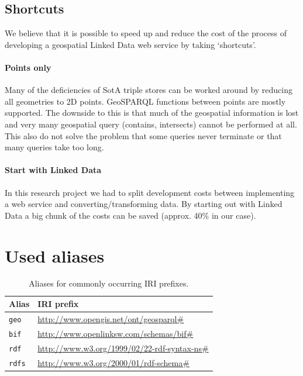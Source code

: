 \documentclass[a4paper]{scrartcl}
\newcommand{\textt}[1]{{\small \texttt{#1}}}
\begin{document}
\subsection{Shortcuts}

We believe that it is possible to speed up and reduce the cost of the
process of developing a geospatial Linked Data web service by taking
`shortcuts'.


\paragraph{Points only}

Many of the deficiencies of SotA triple stores can be worked around by
reducing all geometries to 2D points.  GeoSPARQL functions between
points are mostly supported.  The downside to this is that much of the
geospatial information is lost and very many geospatial query
(contains, intersects) cannot be performed at all.  This also do not
solve the problem that some queries never terminate or that many
queries take too long.


\paragraph{Start with Linked Data}

In this research project we had to split development costs between
implementing a web service and converting/transforming data.  By
starting out with Linked Data a big chunk of the costs can be saved
(approx. 40\% in our case).





\appendix

\section{Used aliases}

\begin{table}
  \centering
  \begin{tabular}{|l|l|}
    \hline
    \textbf{Alias} & \textbf{IRI prefix}\\
    \hline
    \hline
    \textt{geo}    & \url{http://www.opengis.net/ont/geosparql#}\\
    \hline
    \textt{bif}    & \url{http://www.openlinksw.com/schemas/bif#}\\
    \hline
    \textt{rdf}    & \url{http://www.w3.org/1999/02/22-rdf-syntax-ns#}\\
    \hline
    \textt{rdfs}   & \url{http://www.w3.org/2000/01/rdf-schema#}\\
    \hline
  \end{tabular}
  \caption{Aliases for commonly occurring IRI prefixes.}
  \label{tab:alias}
\end{table}
  
\end{document}
